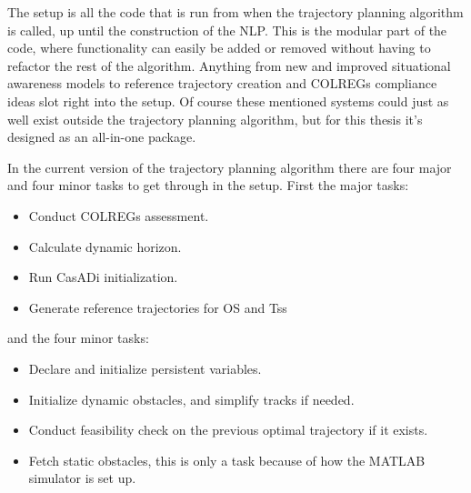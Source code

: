 The setup is all the code that is run from when the trajectory planning algorithm is called, up until the construction of the \gls{NLP}.
This is the modular part of the code, where functionality can easily be added or removed without having to refactor
the rest of the algorithm. Anything from new and improved situational awareness models to reference trajectory creation and
COLREGs compliance ideas slot right into the setup. Of course these mentioned systems could just as well exist outside the
trajectory planning algorithm, but for this thesis it's designed as an all-in-one package.

In the current version of the trajectory planning algorithm there are four major and four minor tasks to get through
in the setup. First the major tasks:
\begin{itemize}
    \item Conduct COLREGs assessment.
    \item Calculate dynamic horizon.
    \item Run CasADi initialization.
    \item Generate reference trajectories for \gls{OS} and \gls{Ts}s
\end{itemize}
and the four minor tasks:
\begin{itemize}
    \item Declare and initialize persistent variables.
    \item Initialize dynamic obstacles, and simplify tracks if needed.
    \item Conduct feasibility check on the previous optimal trajectory if it exists.
    \item Fetch static obstacles, this is only a task because of how the MATLAB simulator is set up.
\end{itemize}

